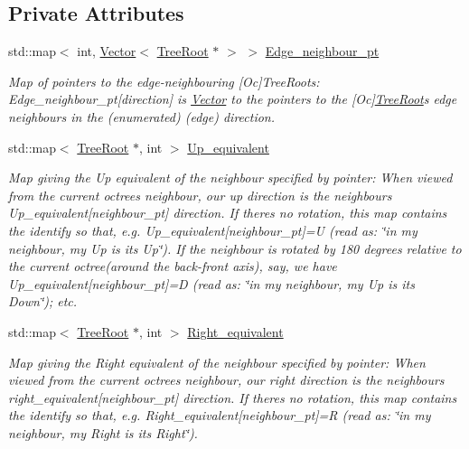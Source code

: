 \subsection*{Private Attributes}
\begin{DoxyCompactItemize}
\item 
std\+::map$<$ int, \hyperlink{classoomph_1_1Vector}{Vector}$<$ \hyperlink{classoomph_1_1TreeRoot}{Tree\+Root} $\ast$ $>$ $>$ \hyperlink{classoomph_1_1OcTreeRoot_afa562a1888008194b352be57f2c3d9a9}{Edge\+\_\+neighbour\+\_\+pt}
\begin{DoxyCompactList}\small\item\em Map of pointers to the edge-\/neighbouring \mbox{[}Oc\mbox{]}Tree\+Roots\+: Edge\+\_\+neighbour\+\_\+pt\mbox{[}direction\mbox{]} is \hyperlink{classoomph_1_1Vector}{Vector} to the pointers to the \mbox{[}Oc\mbox{]}\hyperlink{classoomph_1_1TreeRoot}{Tree\+Root}\textquotesingle{}s edge neighbours in the (enumerated) (edge) direction. \end{DoxyCompactList}\item 
std\+::map$<$ \hyperlink{classoomph_1_1TreeRoot}{Tree\+Root} $\ast$, int $>$ \hyperlink{classoomph_1_1OcTreeRoot_af35e1f7300551c1c8d9ad828d3ebccd9}{Up\+\_\+equivalent}
\begin{DoxyCompactList}\small\item\em Map giving the Up equivalent of the neighbour specified by pointer\+: When viewed from the current octree\textquotesingle{}s neighbour, our up direction is the neighbour\textquotesingle{}s Up\+\_\+equivalent\mbox{[}neighbour\+\_\+pt\mbox{]} direction. If there\textquotesingle{}s no rotation, this map contains the identify so that, e.\+g. {\ttfamily Up\+\_\+equivalent}\mbox{[}neighbour\+\_\+pt\mbox{]}=U (read as\+: \char`\"{}in my
neighbour, my Up is its Up\char`\"{}). If the neighbour is rotated by 180 degrees relative to the current octree(around the back-\/front axis), say, we have {\ttfamily Up\+\_\+equivalent}\mbox{[}neighbour\+\_\+pt\mbox{]}=D (read as\+: \char`\"{}in my 
neighbour, my Up is its Down\char`\"{}); etc. \end{DoxyCompactList}\item 
std\+::map$<$ \hyperlink{classoomph_1_1TreeRoot}{Tree\+Root} $\ast$, int $>$ \hyperlink{classoomph_1_1OcTreeRoot_a400dfaf6af4fe47b061faafddfb14680}{Right\+\_\+equivalent}
\begin{DoxyCompactList}\small\item\em Map giving the Right equivalent of the neighbour specified by pointer\+: When viewed from the current octree\textquotesingle{}s neighbour, our right direction is the neighbour\textquotesingle{}s right\+\_\+equivalent\mbox{[}neighbour\+\_\+pt\mbox{]} direction. If there\textquotesingle{}s no rotation, this map contains the identify so that, e.\+g. {\ttfamily Right\+\_\+equivalent}\mbox{[}neighbour\+\_\+pt\mbox{]}=R (read as\+: \char`\"{}in my
neighbour, my Right is its Right\char`\"{}). \end{DoxyCompactList}\end{DoxyCompactItemize}
